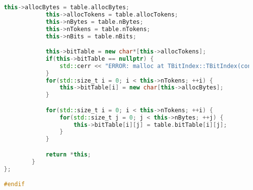 \begin{lstlisting}[language=C++]
            this->allocBytes = table.allocBytes;
            this->allocTokens = table.allocTokens;
            this->nBytes = table.nBytes;
            this->nTokens = table.nTokens;
            this->nBits = table.nBits;

            this->bitTable = new char*[this->allocTokens];
            if(this->bitTable == nullptr) {
                std::cerr << "ERROR: malloc at TBitIndex::TBitIndex(const TBitIndex&)!" << std::endl;
            }
            for(std::size_t i = 0; i < this->nTokens; ++i) {
                this->bitTable[i] = new char[this->allocBytes];
            }

            for(std::size_t i = 0; i < this->nTokens; ++i) {
                for(std::size_t j = 0; j < this->nBytes; ++j) {
                    this->bitTable[i][j] = table.bitTable[i][j];
                }
            }

            return *this;
        }
};

#endif
\end{lstlisting}

